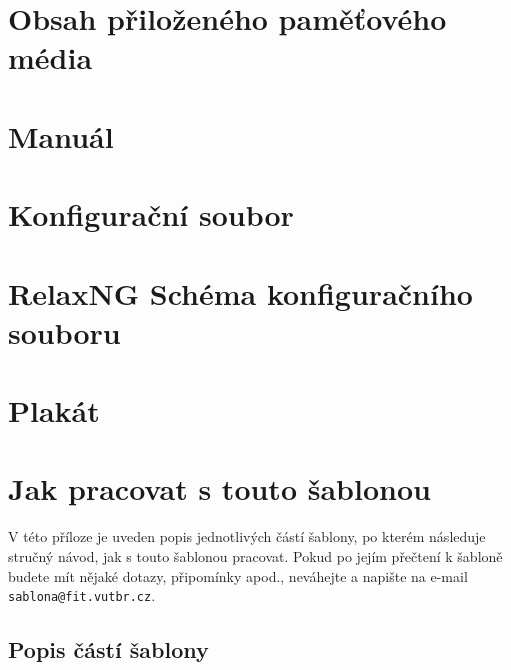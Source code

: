 
\chapter{Obsah přiloženého paměťového média}

\chapter{Manuál}

\chapter{Konfigurační soubor}

\chapter{RelaxNG Schéma konfiguračního souboru}

\chapter{Plakát}

\chapter{Jak pracovat s touto šablonou}
\label{jak}

V této příloze je uveden popis jednotlivých částí šablony, po kterém následuje stručný návod, jak s touto šablonou pracovat. Pokud po jejím přečtení k šabloně budete mít nějaké dotazy, připomínky apod., neváhejte a napište na e-mail \texttt{sablona@fit.vutbr.cz}.

\section*{Popis částí šablony}

